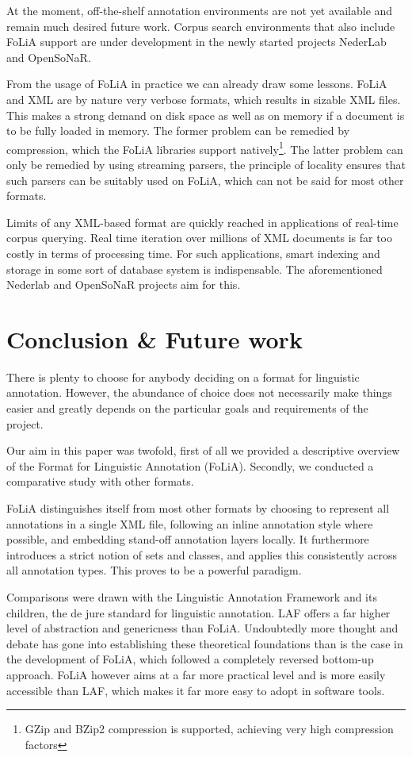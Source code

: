 \documentclass[a4paper,10pt,twoside]{article}
\begin{document}
At the moment, off-the-shelf annotation environments are not yet available and
remain much desired future work. Corpus search environments that also include
FoLiA support are under development in the newly started projects NederLab and
OpenSoNaR. %

From the usage of FoLiA in practice we can already draw some lessons. FoLiA and
XML are by nature very verbose formats, which results in sizable XML files.
This makes a strong demand on disk space as well as on memory if a document is
to be fully loaded in memory. The former problem can be remedied by
compression, which the FoLiA libraries support natively\footnote{GZip and BZip2
compression is supported, achieving very high compression factors}. The latter
problem can only be remedied by using streaming parsers, the principle of
locality ensures that such parsers can be suitably used on FoLiA, which can not
be said for most other formats.

Limits of any XML-based format are quickly reached in applications of real-time corpus
querying. Real time iteration over millions of XML documents is far too costly in terms
of processing time. For such applications, smart indexing and storage in some sort of
database system is indispensable. The aforementioned Nederlab and OpenSoNaR
projects aim for this. 

\section{Conclusion \& Future work}

There is plenty to choose for anybody deciding on a format for
linguistic annotation. However, the abundance of choice does not necessarily make
things easier and greatly depends on the particular goals and requirements of the
project.  

Our aim in this paper was twofold, first of all we provided a descriptive
overview of the Format for Linguistic Annotation (FoLiA). Secondly, we
conducted a comparative study with other formats.

FoLiA distinguishes itself from most other formats by choosing to represent
all annotations in a single XML file, following an inline annotation style where
possible, and embedding stand-off annotation layers locally. It furthermore
introduces a strict notion of sets and classes, and applies this consistently
across all annotation types. This proves to be a powerful paradigm.

Comparisons were drawn with the Linguistic Annotation Framework and its
children, the de jure standard for linguistic annotation. LAF offers a far
higher level of abstraction and genericness than FoLiA. Undoubtedly more
thought and debate has gone into establishing these theoretical foundations
than is the case in the development of FoLiA, which followed a completely
reversed bottom-up approach. FoLiA however aims at a far more practical level and is
more easily accessible than LAF, which makes it far more easy to adopt in
software tools. 
\end{document}
